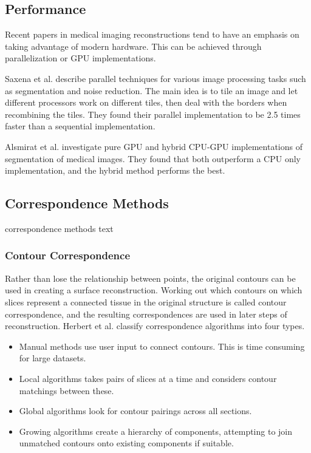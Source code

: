 \documentclass[11p, titlepage]{article}
\begin{document}
\subsection{Performance}

Recent papers in medical imaging reconstructions tend to have an emphasis on taking advantage of modern hardware. This can be achieved through parallelization or GPU implementations.

Saxena et al. \cite{saxena2013image} describe parallel techniques for various image processing tasks such as segmentation and noise reduction. The main idea is to tile an image and let different processors work on different tiles, then deal with the borders when recombining the tiles. They found their parallel implementation to be 2.5 times faster than a sequential implementation.

Alsmirat et al. \cite{alsmirat2017accelerating} investigate pure GPU and hybrid CPU-GPU implementations of segmentation of medical images. They found that both outperform a CPU only implementation, and the hybrid method performs the best.

\subsection{Correspondence Methods}

correspondence methods text

\subsubsection{Contour Correspondence}

Rather than lose the relationship between points, the original contours can be used in creating a surface reconstruction. Working out which contours on which slices represent a connected tissue in the original structure is called contour correspondence, and the resulting correspondences are used in later steps of reconstruction.
\newline
\linebreak
Herbert et al. \cite{herbert2001contour} classify correspondence algorithms into four types. \begin{itemize}
\item Manual methods use user input to connect contours. This is time consuming for large datasets.
\item Local algorithms takes pairs of slices at a time and considers contour matchings between these.
\item Global algorithms look for contour pairings across all sections.
\item Growing algorithms create a hierarchy of components, attempting to join unmatched contours onto existing components if suitable.
\end{itemize}
\end{document}
